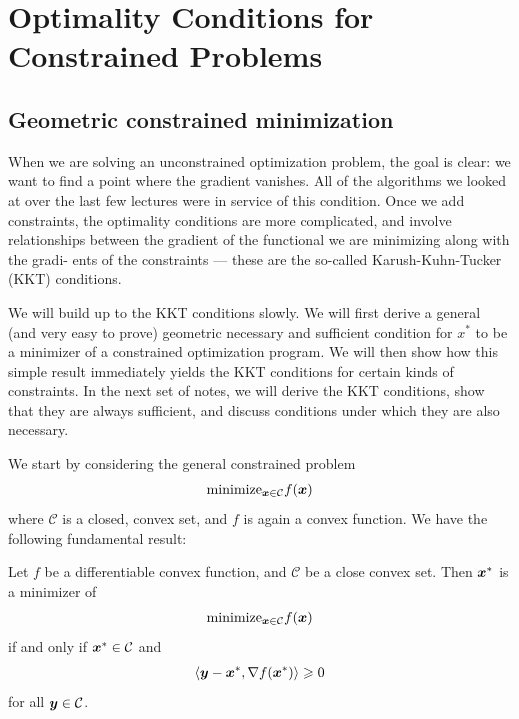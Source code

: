 \chapter{Optimality Conditions for Constrained Problems}

\section{Geometric constrained minimization}
When we are solving an unconstrained optimization problem, the
goal is clear: we want to find a point where the gradient vanishes.
All of the algorithms we looked at over the last few lectures were in
service of this condition. Once we add constraints, the optimality
conditions are more complicated, and involve relationships between
the gradient of the functional we are minimizing along with the gradi-
ents of the constraints — these are the so-called Karush-Kuhn-Tucker
(KKT) conditions.
\par
We will build up to the KKT conditions slowly. We will first derive a
general (and very easy to prove)
geometric
necessary and sufficient
condition for $x^*$ to be a minimizer of a constrained optimization
program. We will then show how this simple result immediately
yields the KKT conditions for certain kinds of constraints. In the
next set of notes, we will derive the KKT conditions, show that they
are always sufficient, and discuss conditions under which they are
also necessary.

We start by considering the general constrained problem
\begin{align*}
    \text{minimize}_{\boldsymbol{x}\in\mathcal{C}} f(\boldsymbol{x})
\end{align*}
where $\mathcal{C}$ is a closed, convex set, and $f$ is again a convex function. 
We have the following fundamental result:

\begin{theorem}{}{}
    Let $f$ be a differentiable convex function, and $\mathcal{C}$ be a close convex set. Then $\boldsymbol{x}^*$ is a minimizer of 
    \begin{align*}
        \text{minimize}_{\boldsymbol{x}\in\mathcal{C}} f(\boldsymbol{x})
    \end{align*}
    if and only if $\boldsymbol{x}^*\in \mathcal{C}$ and 
    \begin{align*}
        \langle\boldsymbol{y}-\boldsymbol{x}^*,\nabla f(\boldsymbol{x}^*)\rangle \geqslant 0
    \end{align*}
    for all $\boldsymbol{y}\in \mathcal{C}$.
\end{theorem}

